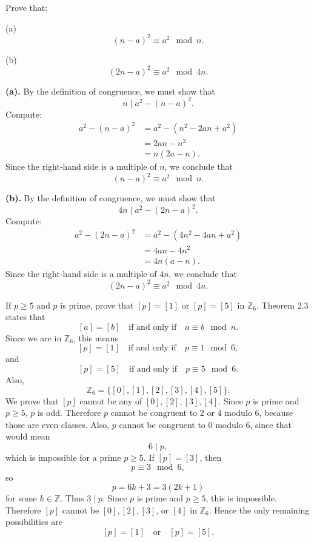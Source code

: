 
\begin{problem}{
    Prove that:

    (a)
    \[
        (n-a)^2\equiv a^2 \mod n.
    \]

    (b)
    \[
        (2n-a)^2\equiv a^2 \mod {4n}.
    \]
}
    \textbf{(a).}
    By the definition of congruence, we must show that
    \[
        n\mid a^2-(n-a)^2.
    \]
    Compute:
    \begin{align*}
        a^2-(n-a)^2
        &= a^2-(n^2-2an+a^2)\\
        &= 2an-n^2\\
        &= n(2a-n).
    \end{align*}
    Since the right-hand side is a multiple of $n$, we conclude that
    \[
        (n-a)^2\equiv a^2\mod n.
    \]

    \textbf{(b).}
    By the definition of congruence, we must show that
    \[
        4n\mid a^2-(2n-a)^2.
    \]
    Compute:
    \begin{align*}
        a^2-(2n-a)^2
        &= a^2-(4n^2-4an+a^2)\\
        &= 4an-4n^2\\
        &= 4n(a-n).
    \end{align*}
    Since the right-hand side is a multiple of $4n$, we conclude that
    \[
        (2n-a)^2\equiv a^2\mod {4n}.
    \]
\end{problem}

\begin{problem}{
    If $p\geq 5$ and $p$ is prime, prove that $[p]=[1]$ or $[p]=[5]$ in $\mathbb{Z}_6$.
}
    Theorem 2.3 states that
    \[
        [a]=[b]
        \quad\text{if and only if}\quad
        a\equiv b\mod n.
    \]
    Since we are in $\mathbb{Z}_6$, this means
    \[
        [p]=[1]
        \quad\text{if and only if}\quad
        p\equiv 1\mod 6,
    \]
    and
    \[
        [p]=[5]
        \quad\text{if and only if}\quad
        p\equiv 5\mod 6.
    \]    Also,
    \[
        \mathbb{Z}_6=\{[0],[1],[2],[3],[4],[5]\}.
    \]
    We prove that $[p]$ cannot be any of $[0],[2],[3],[4]$.
    Since $p$ is prime and $p\geq 5$, $p$ is odd.
    Therefore $p$ cannot be congruent to $2$ or $4$ modulo $6$, because those are even classes.
    Also, $p$ cannot be congruent to $0$ modulo $6$, since that would mean
    \[
        6\mid p,
    \]
    which is impossible for a prime $p\geq 5$.
    If $[p]=[3]$, then
    \[
        p\equiv 3\mod 6,
    \]
    so
    \[
        p=6k+3=3(2k+1)
    \]
    for some $k\in\mathbb{Z}$.
    Thus $3\mid p$.
    Since $p$ is prime and $p\geq 5$, this is impossible.
    Therefore $[p]$ cannot be $[0],[2],[3]$, or $[4]$ in $\mathbb{Z}_6$.
    Hence the only remaining possibilities are
    \[
        [p]=[1]
        \quad\text{or}\quad
        [p]=[5].
    \]
\end{problem}

